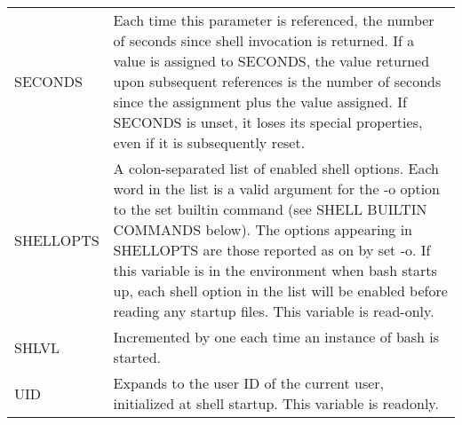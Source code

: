 \documentclass[11pt]{article}
\begin{document}
\begin{longtable}{p{}p{}}
SECONDS &
Each time this parameter is referenced, the number of seconds since shell invocation is returned. If a value is assigned to SECONDS, the value returned upon subsequent references is the number of seconds since the assignment plus the value assigned. If SECONDS is unset, it loses its special properties, even if it is subsequently reset. \\

SHELLOPTS &
A colon-separated list of enabled shell options. Each word in the list is a valid argument for the -o option to the set builtin command (see SHELL BUILTIN COMMANDS below). The options appearing in SHELLOPTS are those reported as on by set -o. If this variable is in the environment when bash starts up, each shell option in the list will be enabled before reading any startup files. This variable is read-only. \\

SHLVL &
Incremented by one each time an instance of bash is started. \\

UID &
Expands to the user ID of the current user, initialized at shell startup. This variable is readonly. \\

\end{longtable}
\end{document}
